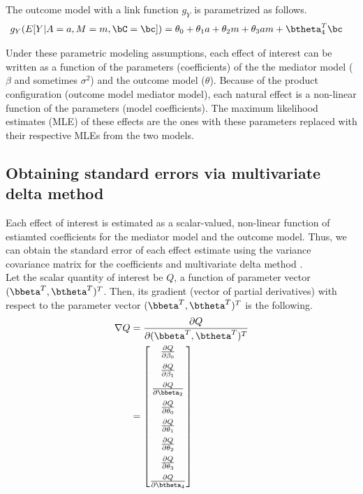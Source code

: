 \documentclass[10pt]{article}
\begin{document}
The outcome model with a link function \(g_{Y}\) is parametrized as follows.
\begin{align*}
  g_{Y}(E[Y|A=a,M=m,\bC=\bc]) &= \theta_{0} + \theta_{1}a + \theta_{2}m + \theta_{3}am + \btheta_{4}^{T}\bc
\end{align*}

Under these parametric modeling assumptions, each effect of interest can be written as a function of the parameters (coefficients) of the the mediator model (\(\beta\) and sometimes \(\sigma^{2}\)) and the outcome model (\(\theta\)). Because of the product configuration (outcome model \texttimes{} mediator model), each natural effect is a non-linear function of the parameters (model coefficients). The maximum likelihood estimates (MLE) of these effects are the ones with these parameters replaced with their respective MLEs from the two models.

\subsection{Obtaining standard errors via multivariate delta method}
\label{sec:orga24421a}

Each effect of interest is estimated as a scalar-valued, non-linear function of estiamted coefficients for the mediator model and the outcome model. Thus, we can obtain the standard error of each effect estimate using the variance covariance matrix for the coefficients and multivariate delta method \cite{hoefWhoInventedDelta2012}.\\

Let the scalar quantity of interest be \(Q\), a function of parameter vector \((\bbeta^{T},\btheta^{T})^{T}\). Then, its gradient (vector of partial derivatives) with respect to the parameter vector \((\bbeta^{T},\btheta^{T})^{T}\) is the following.\\

\begin{align*}
\nabla Q &= \frac{\partial Q}{\partial (\bbeta^{T},\btheta^{T})^{T}}\\
         &= \begin{bmatrix}
           \frac{\partial Q}{\partial \beta_{0}}\\[6pt]
           \frac{\partial Q}{\partial \beta_{1}}\\[6pt]
           \frac{\partial Q}{\partial \bbeta_{2}}\\[6pt]
           \frac{\partial Q}{\partial \theta_{0}}\\[6pt]
           \frac{\partial Q}{\partial \theta_{1}}\\[6pt]
           \frac{\partial Q}{\partial \theta_{2}}\\[6pt]
           \frac{\partial Q}{\partial \theta_{3}}\\[6pt]
           \frac{\partial Q}{\partial \btheta_{4}}\\
         \end{bmatrix}\\
\end{align*}
\end{document}
